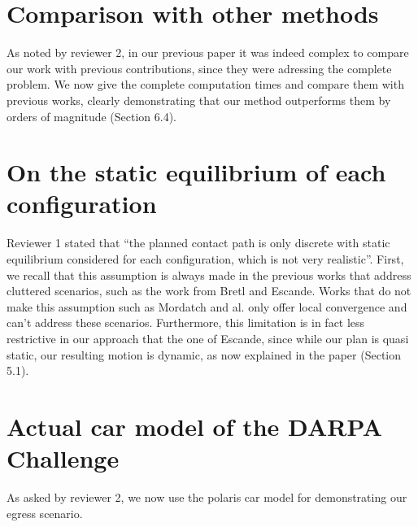 \documentclass[a4paper]{article}
\begin{document}
\section{Comparison with other methods}
As noted by reviewer 2, in our previous paper it was indeed complex to compare our work with previous contributions,
since they were adressing the complete problem. We now give the complete computation times and compare them with previous works,
clearly demonstrating that our method outperforms them by orders of magnitude (Section 6.4).


\section{On the static equilibrium of each configuration}
Reviewer 1 stated that ``the planned contact path is only discrete with static equilibrium considered for each
configuration, which is not very realistic''. First, we recall that this assumption is always made in the previous works that address cluttered scenarios,
such as the work from Bretl and Escande. Works that do not make this assumption such as Mordatch and al. only offer local convergence and can't address these scenarios. Furthermore, this limitation is in fact less restrictive in our approach that the one of Escande, since while our plan is quasi static, our resulting motion is dynamic, as now explained in the paper (Section 5.1). 

\section{Actual car model of the DARPA Challenge}
As asked by reviewer 2, we now use the polaris car model for demonstrating our egress scenario.
\end{document}
